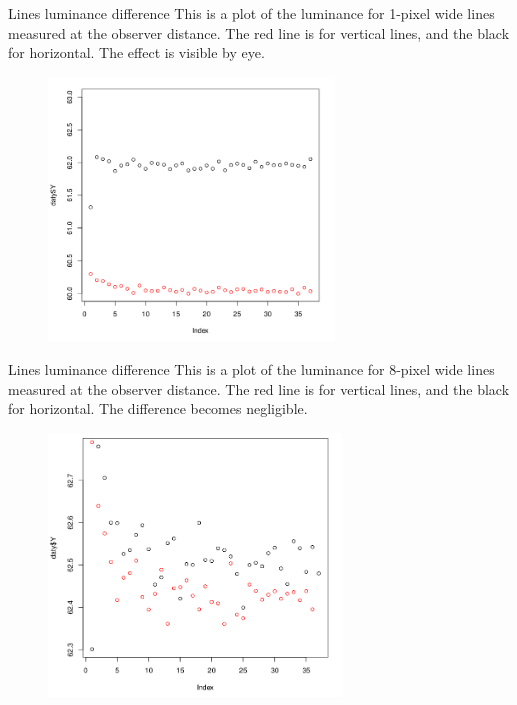 \documentclass{beamer}
\begin{document}
\begin{frame}[t]{Lines luminance difference}
This is a plot of the luminance for 1-pixel wide lines measured at the observer distance. The red line is for vertical lines, and the black for horizontal. The effect is visible by eye.
\begin{figure}[c]
\includegraphics[height=7cm]{line1dist.png}
\end{figure}
\end{frame}

\begin{frame}[t]{Lines luminance difference}
This is a plot of the luminance for 8-pixel wide lines measured at the observer distance. The red line is for vertical lines, and the black for horizontal. The difference becomes negligible.
\begin{figure}[c]
\includegraphics[height=7cm]{line8dist.png}
\end{figure}
\end{frame}
\end{document}
